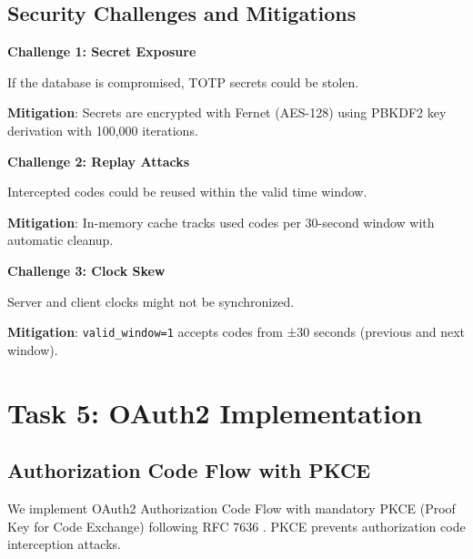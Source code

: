 \documentclass[12pt,a4paper]{article}
\begin{document}
\subsection{Security Challenges and Mitigations}

\textbf{Challenge 1: Secret Exposure}

If the database is compromised, TOTP secrets could be stolen.

\textbf{Mitigation}: Secrets are encrypted with Fernet (AES-128) using PBKDF2 key derivation with 100,000 iterations.

\textbf{Challenge 2: Replay Attacks}

Intercepted codes could be reused within the valid time window.

\textbf{Mitigation}: In-memory cache tracks used codes per 30-second window with automatic cleanup.

\textbf{Challenge 3: Clock Skew}

Server and client clocks might not be synchronized.

\textbf{Mitigation}: \texttt{valid\_window=1} accepts codes from ±30 seconds (previous and next window).

\section{Task 5: OAuth2 Implementation}

\subsection{Authorization Code Flow with PKCE}

We implement OAuth2 Authorization Code Flow with mandatory PKCE (Proof Key for Code Exchange) following RFC 7636 \cite{sakimura2015}. PKCE prevents authorization code interception attacks.
\end{document}
